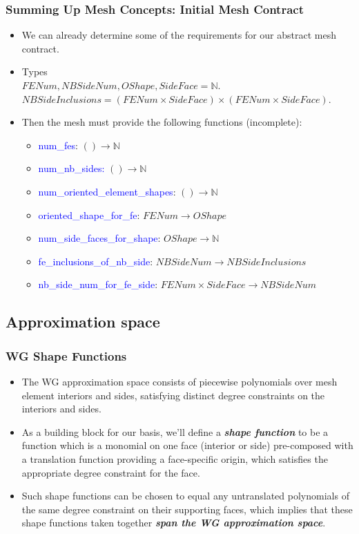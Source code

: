 \documentclass[compress]{beamer}
\begin{document}
\begin{frame}
  \frametitle{Summing Up Mesh Concepts: Initial Mesh Contract}
  \begin{itemize}[<+->]
    \item We can already determine some of the requirements for our abstract mesh contract.
    \item Types \\
      $FENum, NBSideNum, OShape, SideFace = \mathbb{N}$.\\
      $NBSideInclusions = (FENum \times SideFace) \times (FENum \times SideFace)$.
    \item Then the mesh must provide the following functions (incomplete):
      \begin{itemize}[<+->]
        \item \textcolor{blue}{num\_fes}: $() \rightarrow \mathbb{N}$
        \item \textcolor{blue}{num\_nb\_sides:} $() \rightarrow \mathbb{N}$
        \item \textcolor{blue}{num\_oriented\_element\_shapes}: $() \rightarrow \mathbb{N}$
        \item \textcolor{blue}{oriented\_shape\_for\_fe}:  $FENum \rightarrow OShape$
        \item \textcolor{blue}{num\_side\_faces\_for\_shape}: $OShape \rightarrow \mathbb{N}$
        \item \textcolor{blue}{fe\_inclusions\_of\_nb\_side}: $NBSideNum \rightarrow NBSideInclusions $
        \item \textcolor{blue}{nb\_side\_num\_for\_fe\_side}: $FENum \times SideFace \rightarrow NBSideNum$
      \end{itemize}
  \end{itemize}
\end{frame}

\subsection{Approximation space}

\begin{frame}
  \frametitle{WG Shape Functions}
  \begin{itemize}[<+->]
    \item The WG approximation space consists of piecewise polynomials over mesh element interiors and sides,
      satisfying distinct degree constraints on the interiors and sides.
    \item As a building block for our basis, we'll define a \emph{\textbf{shape function}} to be a function which is a monomial on one face
      (interior or side) pre-composed with a translation function providing a face-specific origin, which satisfies the appropriate
      degree constraint for the face.
    \item Such shape functions can be chosen to equal any untranslated polynomials of the same degree constraint on their supporting faces,
      which implies that these shape functions taken together \emph{\textbf{span the WG approximation space}}. 
  \end{itemize}
\end{frame}
\end{document}
